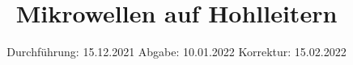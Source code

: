 

\subject{V53}
\title{Mikrowellen auf Hohlleitern}
\date{%
  Durchführung: 15.12.2021
  \hspace{3em}
  Abgabe: 10.01.2022 
\hspace{3em}
  Korrektur: 15.02.2022
}



\maketitle
\thispagestyle{empty}
\tableofcontents
\newpage







\printbibliography{}


